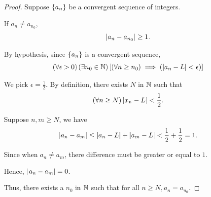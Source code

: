 \subsubsection{}
\begin{proof}
    Suppose $\left\{a_n\right\}$ be a convergent sequence of integers. 

    If $a_n \neq a_{n_0}$,  
    \begin{equation*}
        \left|a_n - a_{n_0}\right| \geq 1. 
    \end{equation*}

    By hypothesis, since $\left\{a_n\right\}$ is a convergent sequence, 
    \begin{equation*}
        \left(\forall \epsilon > 0\right) \left(\exists n_0 \in \mathbb{N} \right)\left[\left(\forall n \geq n_0\right) \implies \left(\left|a_n - L\right| < \epsilon\right)\right]
    \end{equation*}

    We pick $\epsilon = \frac{1}{2}$. By definition, there exists $N$ in $\mathbb{N}$ such that 
    \begin{equation*}
        \left(\forall n \geq N\right)\left|x_n - L\right| < \frac{1}{2}. 
    \end{equation*}

    Suppose $n, m \geq N$, we have 
    \begin{equation*}
        \left|a_n - a_m \right| \leq \left|a_n - L\right| + \left|a_m - L\right| < \frac{1}{2} + \frac{1}{2} = 1. 
    \end{equation*} 

    Since when $a_n \neq a_m$, there difference must be greater or equal to $1$. 

    Hence, $\left|a_n - a_m\right| = 0$. 

    Thus, there exists a $n_0$ in $\mathbb{N}$ such that for all $n \geq N, a_n = a_{n_0}$. 
\end{proof}
